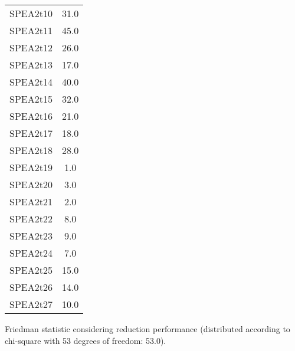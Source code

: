 \documentclass{article}
\begin{document}
\begin{table}[!htp]
\begin{tabular}{c|c}
SPEA2t10&31.0\\
SPEA2t11&45.0\\
SPEA2t12&26.0\\
SPEA2t13&17.0\\
SPEA2t14&40.0\\
SPEA2t15&32.0\\
SPEA2t16&21.0\\
SPEA2t17&18.0\\
SPEA2t18&28.0\\
SPEA2t19&1.0\\
SPEA2t20&3.0\\
SPEA2t21&2.0\\
SPEA2t22&8.0\\
SPEA2t23&9.0\\
SPEA2t24&7.0\\
SPEA2t25&15.0\\
SPEA2t26&14.0\\
SPEA2t27&10.0\\
\end{tabular}
\end{table}


Friedman statistic considering reduction performance (distributed according to chi-square with 53 degrees of freedom: 53.0).
\end{document}
